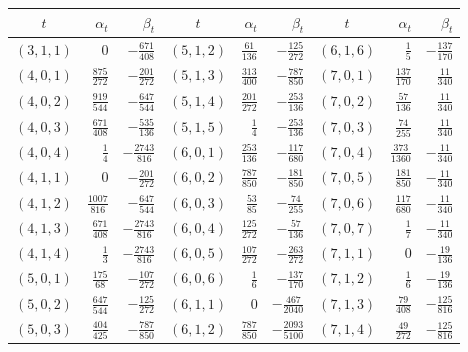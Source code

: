 \documentclass[11pt,a4paper]{article}
\theoremstyle{definition}\newtheorem{definition}[theorem]{Definition}
\theoremstyle{remark}\newtheorem{remark}[theorem]{Remark}
\begin{document}
\begin{center}\small
\renewcommand{\arraystretch}{1.2}
\begin{tabular}{crr@{\qquad}crr@{\qquad}crr}
\toprule $t$&$\alpha_t$&$\beta_t$&$t$&$\alpha_t$&$\beta_t$&$t$&$\alpha_t$&$\beta_t$\\\midrule
$(3,1,1)$ & $0$ & $-\frac{671}{408}$ & $(5,1,2)$ & $\frac{61}{136}$ & $-\frac{125}{272}$ & $(6,1,6)$ & $\frac{1}{5}$ & $-\frac{137}{170}$\\[2pt]
$(4,0,1)$ & $\frac{875}{272}$ & $-\frac{201}{272}$ & $(5,1,3)$ & $\frac{313}{400}$ & $-\frac{787}{850}$ & $(7,0,1)$ & $\frac{137}{170}$ & $\frac{11}{340}$\\[2pt]
$(4,0,2)$ & $\frac{919}{544}$ & $-\frac{647}{544}$ & $(5,1,4)$ & $\frac{201}{272}$ & $-\frac{253}{136}$ & $(7,0,2)$ & $\frac{57}{136}$ & $\frac{11}{340}$\\[2pt]
$(4,0,3)$ & $\frac{671}{408}$ & $-\frac{535}{136}$ & $(5,1,5)$ & $\frac{1}{4}$ & $-\frac{253}{136}$ & $(7,0,3)$ & $\frac{74}{255}$ & $\frac{11}{340}$\\[2pt]
$(4,0,4)$ & $\frac{1}{4}$ & $-\frac{2743}{816}$ & $(6,0,1)$ & $\frac{253}{136}$ & $-\frac{117}{680}$ & $(7,0,4)$ & $\frac{373}{1360}$ & $-\frac{11}{340}$\\[2pt]
$(4,1,1)$ & $0$ & $-\frac{201}{272}$ & $(6,0,2)$ & $\frac{787}{850}$ & $-\frac{181}{850}$ & $(7,0,5)$ & $\frac{181}{850}$ & $-\frac{11}{340}$\\[2pt]
$(4,1,2)$ & $\frac{1007}{816}$ & $-\frac{647}{544}$ & $(6,0,3)$ & $\frac{53}{85}$ & $-\frac{74}{255}$ & $(7,0,6)$ & $\frac{117}{680}$ & $-\frac{11}{340}$\\[2pt]
$(4,1,3)$ & $\frac{671}{408}$ & $-\frac{2743}{816}$ & $(6,0,4)$ & $\frac{125}{272}$ & $-\frac{57}{136}$ & $(7,0,7)$ & $\frac{1}{7}$ & $-\frac{11}{340}$\\[2pt]
$(4,1,4)$ & $\frac{1}{3}$ & $-\frac{2743}{816}$ & $(6,0,5)$ & $\frac{107}{272}$ & $-\frac{263}{272}$ & $(7,1,1)$ & $0$ & $-\frac{19}{136}$\\[2pt]
$(5,0,1)$ & $\frac{175}{68}$ & $-\frac{107}{272}$ & $(6,0,6)$ & $\frac{1}{6}$ & $-\frac{137}{170}$ & $(7,1,2)$ & $\frac{1}{6}$ & $-\frac{19}{136}$\\[2pt]
$(5,0,2)$ & $\frac{647}{544}$ & $-\frac{125}{272}$ & $(6,1,1)$ & $0$ & $-\frac{467}{2040}$ & $(7,1,3)$ & $\frac{79}{408}$ & $-\frac{125}{816}$\\[2pt]
$(5,0,3)$ & $\frac{404}{425}$ & $-\frac{787}{850}$ & $(6,1,2)$ & $\frac{787}{850}$ & $-\frac{2093}{5100}$ & $(7,1,4)$ & $\frac{49}{272}$ & $-\frac{125}{816}$\\[2pt]

\end{tabular}
\end{center}
\end{document}
